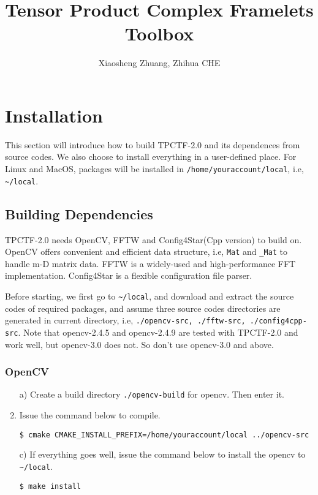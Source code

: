 \documentclass[a4paper,5pt]{article}
\title{Tensor Product Complex Framelets Toolbox}
\author{Xiaosheng Zhuang,    Zhihua CHE}
\date{}
\begin{document}
\maketitle

\tableofcontents

\section{Installation}
This section will introduce how to build TPCTF-2.0 and its dependences from source codes. We also choose to install everything in a user-defined place. For Linux and MacOS, packages will be installed in \lstinline{/home/youraccount/local}, i.e, \lstinline{~/local}.

\subsection{Building Dependencies}
  TPCTF-2.0 needs OpenCV, FFTW and Config4Star(Cpp version) to build on. OpenCV offers convenient and efficient data structure, i.e, \lstinline{Mat} and \lstinline{_Mat} to handle m-D matrix data. FFTW is a widely-used and high-performance FFT implementation. Config4Star is a flexible configuration file parser.
  
  Before starting, we first go to \lstinline{~/local}, and download and extract the source codes of required packages, and assume three source codes directories are generated in current directory, i.e, \lstinline{./opencv-src, ./fftw-src, ./config4cpp-src}. Note that opencv-2.4.5 and opencv-2.4.9 are tested with TPCTF-2.0 and work well, but opencv-3.0 does not. So don't use opencv-3.0 and above.
  
\subsubsection{OpenCV}

\begin{enumerate}

\item[a)] Create a build directory \lstinline{./opencv-build} for opencv. Then enter it.
\item[b)] Issue the command below to compile.

\lstinline{$ cmake CMAKE_INSTALL_PREFIX=/home/youraccount/local ../opencv-src}
\item[c)] If everything goes well, issue the command below to install the opencv to \lstinline{~/local}.

\lstinline{$ make install}
\end{enumerate}
\end{document}
